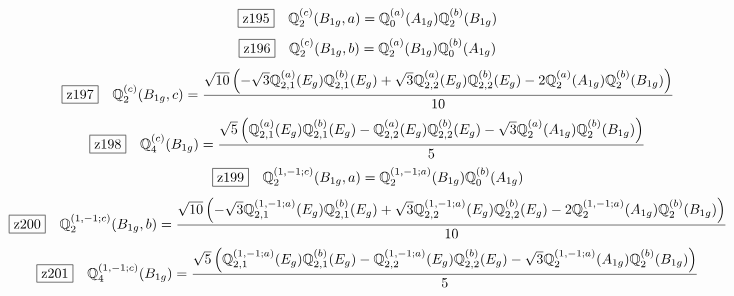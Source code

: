 \documentclass[fleqn,10pt,landscape]{jsarticle}
\begin{document}
\begin{dmath*}
\hspace*{3mm}\fbox{z195}\quad \mathbb{Q}_{2}^{(c)}(B_{1g},a)=\mathbb{Q}_{0}^{(a)}(A_{1g}) \mathbb{Q}_{2}^{(b)}(B_{1g})
\end{dmath*}
\begin{dmath*}
\hspace*{3mm}\fbox{z196}\quad \mathbb{Q}_{2}^{(c)}(B_{1g},b)=\mathbb{Q}_{2}^{(a)}(B_{1g}) \mathbb{Q}_{0}^{(b)}(A_{1g})
\end{dmath*}
\begin{dmath*}
\hspace*{3mm}\fbox{z197}\quad \mathbb{Q}_{2}^{(c)}(B_{1g},c)=\frac{\sqrt{10} \left(- \sqrt{3} \mathbb{Q}_{2,1}^{(a)}(E_{g}) \mathbb{Q}_{2,1}^{(b)}(E_{g}) + \sqrt{3} \mathbb{Q}_{2,2}^{(a)}(E_{g}) \mathbb{Q}_{2,2}^{(b)}(E_{g}) - 2 \mathbb{Q}_{2}^{(a)}(A_{1g}) \mathbb{Q}_{2}^{(b)}(B_{1g})\right)}{10}
\end{dmath*}
\begin{dmath*}
\hspace*{3mm}\fbox{z198}\quad \mathbb{Q}_{4}^{(c)}(B_{1g})=\frac{\sqrt{5} \left(\mathbb{Q}_{2,1}^{(a)}(E_{g}) \mathbb{Q}_{2,1}^{(b)}(E_{g}) - \mathbb{Q}_{2,2}^{(a)}(E_{g}) \mathbb{Q}_{2,2}^{(b)}(E_{g}) - \sqrt{3} \mathbb{Q}_{2}^{(a)}(A_{1g}) \mathbb{Q}_{2}^{(b)}(B_{1g})\right)}{5}
\end{dmath*}
\begin{dmath*}
\hspace*{3mm}\fbox{z199}\quad \mathbb{Q}_{2}^{(1,-1;c)}(B_{1g},a)=\mathbb{Q}_{2}^{(1,-1;a)}(B_{1g}) \mathbb{Q}_{0}^{(b)}(A_{1g})
\end{dmath*}
\begin{dmath*}
\hspace*{3mm}\fbox{z200}\quad \mathbb{Q}_{2}^{(1,-1;c)}(B_{1g},b)=\frac{\sqrt{10} \left(- \sqrt{3} \mathbb{Q}_{2,1}^{(1,-1;a)}(E_{g}) \mathbb{Q}_{2,1}^{(b)}(E_{g}) + \sqrt{3} \mathbb{Q}_{2,2}^{(1,-1;a)}(E_{g}) \mathbb{Q}_{2,2}^{(b)}(E_{g}) - 2 \mathbb{Q}_{2}^{(1,-1;a)}(A_{1g}) \mathbb{Q}_{2}^{(b)}(B_{1g})\right)}{10}
\end{dmath*}
\begin{dmath*}
\hspace*{3mm}\fbox{z201}\quad \mathbb{Q}_{4}^{(1,-1;c)}(B_{1g})=\frac{\sqrt{5} \left(\mathbb{Q}_{2,1}^{(1,-1;a)}(E_{g}) \mathbb{Q}_{2,1}^{(b)}(E_{g}) - \mathbb{Q}_{2,2}^{(1,-1;a)}(E_{g}) \mathbb{Q}_{2,2}^{(b)}(E_{g}) - \sqrt{3} \mathbb{Q}_{2}^{(1,-1;a)}(A_{1g}) \mathbb{Q}_{2}^{(b)}(B_{1g})\right)}{5}
\end{dmath*}
\end{document}
